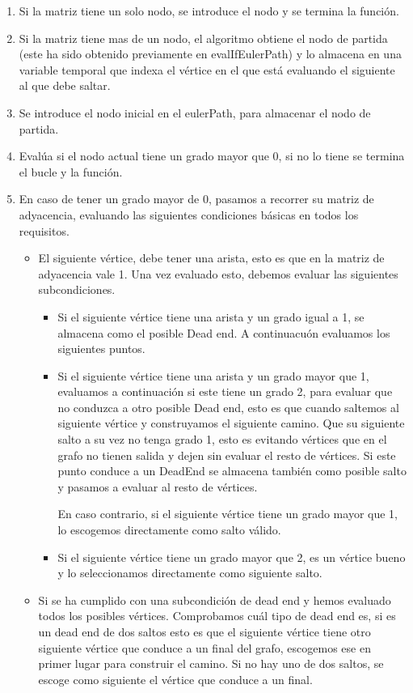 \begin{enumerate}
    \item Si la matriz tiene un solo nodo, se introduce el nodo y se termina la función.
    \item Si la matriz tiene mas de un nodo, el algoritmo obtiene el nodo de partida (este ha sido obtenido previamente en evalIfEulerPath) y lo almacena en una variable temporal que indexa el vértice en el que está evaluando el siguiente al que debe saltar.
    \item Se introduce el nodo inicial en el eulerPath, para almacenar el nodo de partida.
    \item Evalúa si el nodo actual tiene un grado mayor que 0, si no lo tiene se termina el bucle y la función. 
    \item En caso de tener un grado mayor de 0, pasamos a recorrer su matriz de adyacencia, evaluando las siguientes condiciones básicas en todos los requisitos.
    \begin{itemize}
        \item El siguiente vértice, debe tener una arista, esto es que en la matriz de adyacencia vale 1. Una vez evaluado esto, debemos evaluar las siguientes subcondiciones.
        \begin{itemize}
            \item Si el siguiente vértice tiene una arista y un grado igual a 1, se almacena como el posible Dead end. A continuacuón evaluamos los siguientes puntos.
            \item Si el siguiente vértice tiene una arista y un grado mayor que 1, evaluamos a continuación si este tiene un grado 2, para evaluar que no conduzca a otro posible Dead end, esto es que cuando saltemos al siguiente vértice y construyamos el siguiente camino. Que su siguiente salto a su vez no tenga grado 1, esto es evitando vértices que en el grafo no tienen salida y dejen sin evaluar el resto de vértices. Si este punto conduce a un DeadEnd se almacena también como posible salto y pasamos a evaluar al resto de vértices. 
            
            En caso contrario, si el siguiente vértice tiene un grado mayor que 1, lo escogemos directamente como salto válido.
            \item Si el siguiente vértice tiene un grado mayor que 2, es un vértice bueno y lo seleccionamos directamente como siguiente salto.
        \end{itemize}

        \item Si se ha cumplido con una subcondición de dead end y hemos evaluado todos los posibles vértices. Comprobamos cuál tipo de dead end es, si es un dead end de dos saltos esto es que el siguiente vértice tiene otro siguiente vértice que conduce a un final del grafo, escogemos ese en primer lugar para construir el camino. Si no hay uno de dos saltos, se escoge como siguiente el vértice que conduce a un final.
    \end{itemize}
\end{enumerate}

